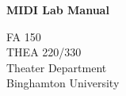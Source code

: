 \begin{titlepage}
        \vspace*{1cm}
        
        \Huge
        \textbf{MIDI Lab Manual}
        
        \vspace{0.5cm}
        \LARGE
        FA 150\\
        

        
        \vfill
        \normalsize
        \noindent
        THEA 220/330\\
        Theater Department\\
        Binghamton University
\end{titlepage}